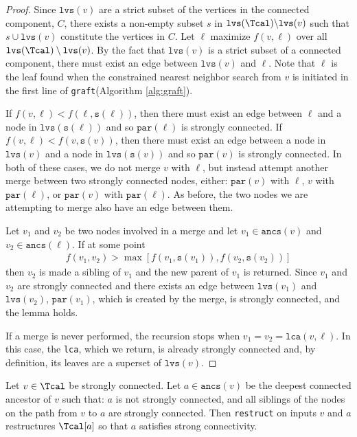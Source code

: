 \documentclass{article} \usepackage[utf8]{inputenc} \usepackage[T1]{fontenc}    \usepackage{hyperref}       \usepackage{url}            \usepackage{booktabs}       \usepackage{amsfonts}       \usepackage{nicefrac}       \usepackage{microtype}      \usepackage{geometry}
\newcommand{\graft}{\texttt{graft}\xspace}
\newcommand{\rst}{\texttt{restruct}\xspace}
\newcommand{\lvs}[1]{\ensuremath{\texttt{lvs}(#1)}}
\newcommand{\ancs}[1]{\ensuremath{\texttt{ancs}(#1)}}
\newcommand{\lca}[2]{\ensuremath{\texttt{lca}(#1, #2)}}
\newcommand{\sib}[1]{\ensuremath{\texttt{s}}(#1)\xspace}
\newcommand{\parent}[1]{\ensuremath{\texttt{par}}(#1)\xspace}
\begin{document}
\begin{appendix}
\begin{proof}
Since $\lvs{v}$ are a strict subset of the vertices in the connected
component, $C$, there exists a non-empty subset $s$ in $\lvs{\Tcal}
\backslash \lvs{v}$ such that $s \cup \lvs{v}$ constitute the vertices
in $C$. Let $\ell$ maximize $f(v,\ell)$ over all $\lvs{\Tcal}
\setminus \lvs{v}$. By the fact that $\lvs{v}$ is a strict subset of a
connected component, there must exist an edge between $\lvs{v}$ and
$\ell$. Note that $\ell$ is the leaf found when the constrained
nearest neighbor search from $v$ is initiated in the first line of
\graft (Algorithm \ref{alg:graft}).

If $f(v, \ell) < f(\ell, \sib{\ell})$, then there must exist an edge
between $\ell$ and a node in $\lvs{\sib{\ell}}$ and
so $\parent{\ell}$ is strongly connected.
If $f(v, \ell) < f(v, \sib{v})$, then there must
exist an edge between a node in $\lvs{v}$ and a node in
 $\lvs{\sib{v}}$ and so $\parent{v}$ is strongly connected.
  In both of these cases, we do not
merge $v$ with $\ell$, but instead attempt another merge between two
strongly connected nodes, either: $\parent{v}$ with $\ell$, $v$ with
$\parent{\ell}$, or $\parent{v}$ with $\parent{\ell}$. As before, the
two nodes we are attempting to merge also have an edge between them.

Let $v_1$ and $v_2$ be two nodes involved in a merge and let $v_1 \in
\ancs{v}$ and $v_2 \in \ancs{\ell}$.  If at some point
\begin{align*}
  f(v_1, v_2) >\max[f(v_1, \sib{v_1}), f(v_2, \sib{v_2})]
\end{align*}
then $v_2$ is made a
sibling of $v_1$ and the new parent of $v_1$ is returned. Since $v_1$
and $v_2$ are strongly connected and there exists an edge between
\lvs{v_1} and \lvs{v_2}, $\parent{v_1}$, which is created by the merge, is
strongly connected, and the lemma holds.

If a merge is never performed, the recursion stops when $v_1 = v_2 =
\lca{v}{\ell}$. In this case, the \texttt{lca}, which we return, is
already strongly connected and, by definition, its leaves are a
superset of $\lvs{v}$.
\end{proof}

\begin{lemma}
Let $v \in \Tcal$ be strongly connected. Let $a \in \ancs{v}$ be the
deepest connected ancestor of $v$ such that: $a$ is not strongly
connected, and all siblings of the nodes on the path from $v$ to $a$
are strongly connected. Then \rst on inputs $v$ and $a$ restructures
$\Tcal[a]$ so that $a$ satisfies strong connectivity.
\end{lemma}


\end{appendix}
\end{document}

